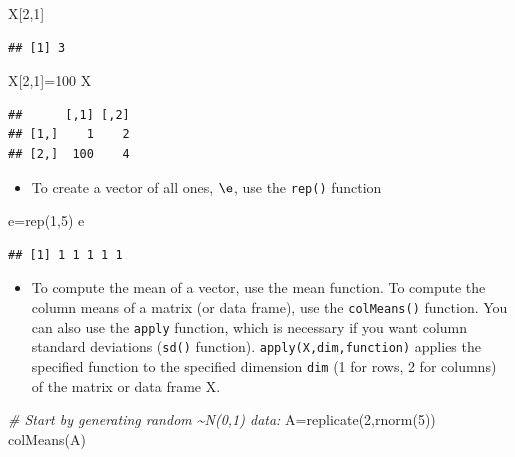 \documentclass[
]{article}
\newenvironment{Shaded}{\begin{snugshade}}{\end{snugshade}}
\newcommand{\CommentTok}[1]{\textcolor[rgb]{0.56,0.35,0.01}{\textit{#1}}}
\newcommand{\DecValTok}[1]{\textcolor[rgb]{0.00,0.00,0.81}{#1}}
\newcommand{\FunctionTok}[1]{\textcolor[rgb]{0.00,0.00,0.00}{#1}}
\newcommand{\NormalTok}[1]{#1}
\newcommand{\OtherTok}[1]{\textcolor[rgb]{0.56,0.35,0.01}{#1}}
\providecommand{\tightlist}{%
  \setlength{\itemsep}{0pt}\setlength{\parskip}{0pt}}
\theoremstyle{definition}
\theoremstyle{definition}
\theoremstyle{definition}
\theoremstyle{definition}
\theoremstyle{remark}
\begin{document}
\begin{Shaded}
\begin{Highlighting}[]
\NormalTok{X[}\DecValTok{2}\NormalTok{,}\DecValTok{1}\NormalTok{]}
\end{Highlighting}
\end{Shaded}

\begin{verbatim}
## [1] 3
\end{verbatim}

\begin{Shaded}
\begin{Highlighting}[]
\NormalTok{X[}\DecValTok{2}\NormalTok{,}\DecValTok{1}\NormalTok{]}\OtherTok{=}\DecValTok{100}
\NormalTok{X}
\end{Highlighting}
\end{Shaded}

\begin{verbatim}
##      [,1] [,2]
## [1,]    1    2
## [2,]  100    4
\end{verbatim}

\begin{itemize}
\tightlist
\item
  To create a vector of all ones, \(\e\), use the \texttt{rep()} function
\end{itemize}

\begin{Shaded}
\begin{Highlighting}[]
\NormalTok{e}\OtherTok{=}\FunctionTok{rep}\NormalTok{(}\DecValTok{1}\NormalTok{,}\DecValTok{5}\NormalTok{)}
\NormalTok{e}
\end{Highlighting}
\end{Shaded}

\begin{verbatim}
## [1] 1 1 1 1 1
\end{verbatim}

\begin{itemize}
\tightlist
\item
  To compute the mean of a vector, use the mean function. To compute the column means of a matrix (or data frame), use the \texttt{colMeans()} function. You can also use the \texttt{apply} function, which is necessary if you want column standard deviations (\texttt{sd()} function). \texttt{apply(X,dim,function)} applies the specified function to the specified dimension \texttt{dim} (1 for rows, 2 for columns) of the matrix or data frame X.
\end{itemize}

\begin{Shaded}
\begin{Highlighting}[]
\CommentTok{\# Start by generating random \textasciitilde{}N(0,1) data:}
\NormalTok{A}\OtherTok{=}\FunctionTok{replicate}\NormalTok{(}\DecValTok{2}\NormalTok{,}\FunctionTok{rnorm}\NormalTok{(}\DecValTok{5}\NormalTok{))}
\FunctionTok{colMeans}\NormalTok{(A)}
\end{Highlighting}
\end{Shaded}
\end{document}
